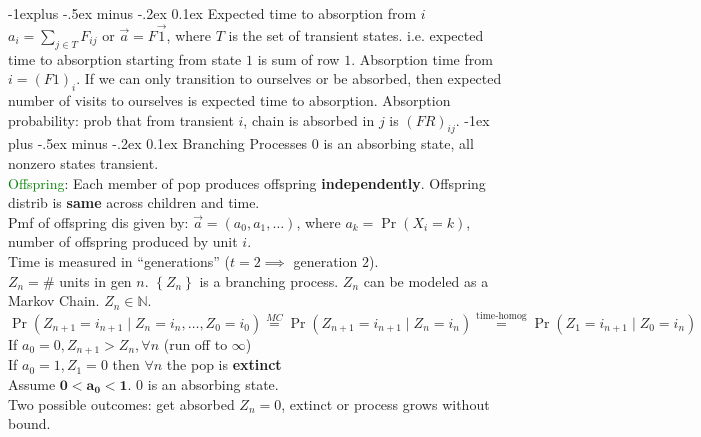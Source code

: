 \documentclass[landscape]{article}
\makeatletter
\renewcommand{\section}{\@startsection{section}{1}{0mm}%
                                {-1ex plus -.5ex minus -.2ex}%
                                {0.1ex}%
                                {\color{blue}\normalfont\large\bfseries}}
\renewcommand{\subsection}{\@startsection{subsection}{2}{0mm}%
                                {-1explus -.5ex minus -.2ex}%
                                {0.1ex}%
                                {\color{orange}\normalfont\normalsize\bfseries}}
\makeatother
\begin{document}
\begin{multicols*}{3}
\subsection{Expected time to absorption from $i$}
$a_i = \sum_{j \in T}F_{ij}$ or $\vec{a} = F \vec{1}$, where $T$ is
the set of transient states. i.e. expected time to absorption starting
from state $1$ is sum of row $1$. Absorption time from $i=
(F1)_i$. If we can only transition to ourselves or be absorbed, then
expected number of visits to ourselves is expected time to absorption. Absorption probability: prob that from transient $i$, chain
is absorbed in $j$ is $(FR)_{ij}$.
\section{Branching Processes}
$0$ is an absorbing state, all nonzero states transient.
\\\textcolor{green}{Offspring}: Each member of pop produces offspring
\textbf{independently}. Offspring distrib is \textbf{same} across
children and time.  \\ Pmf of offspring dis given by:
$\vec{a} = (a_0, a_1, \ldots)$, where $a_k = \Pr(X_i = k)$, number of
offspring produced by unit $i$.  \\ Time is measured in
``generations'' ($t=2 \implies$ generation $2$).  \\ $Z_n =$\# units
in gen $n$. $\left\{Z_n\right\}$ is a branching process. $Z_n$ can be
modeled as a Markov Chain. $Z_n \in \mathbb{N}$.  \\
$\Pr(Z_{n+1} = i_{n+1} \mid Z_n = i_n, \ldots, Z_0 = i_0)
\stackrel{MC}{=} \Pr(Z_{n+1} = i_{n+1} \mid Z_n = i_n)
\stackrel{\text{time-homog}}{=}\Pr(Z_1 = i_{n+1} \mid Z_0 = i_n)$ \\
If $a_0 = 0, Z_{n+1} > Z_n, \forall n$ (run off to $\infty$) \\ If
$a_0 = 1, Z_1 = 0$ then $\forall n$ the pop is \textbf{extinct} \\
Assume $\mathbf{0 < a_0 < 1}$. $0$ is an absorbing state.  \\ Two
possible outcomes: get absorbed $Z_n = 0$, extinct or process grows
without bound.

\end{multicols*}
\end{document}
